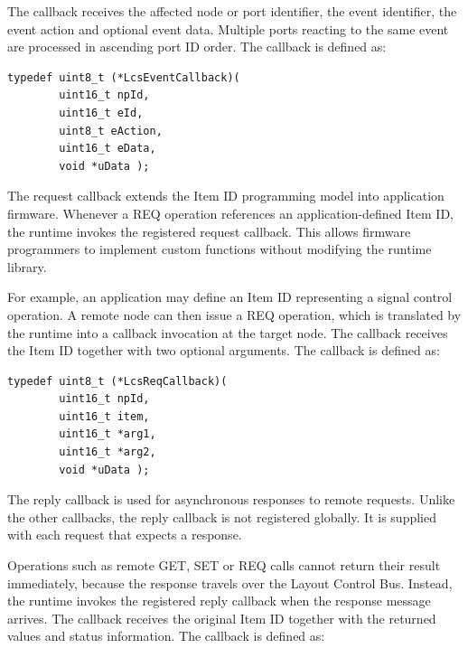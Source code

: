 The callback receives the affected node or port identifier, the event identifier, 
the event action and optional event data. Multiple ports reacting to the same 
event are processed in ascending port ID order. The callback is defined as:

\begin{lstlisting}[style=api-interface]
typedef uint8_t (*LcsEventCallback)(
        uint16_t npId,
        uint16_t eId,
        uint8_t eAction,
        uint16_t eData,
        void *uData );
\end{lstlisting}


The request callback extends the Item ID programming model into application 
firmware. Whenever a REQ operation references an application-defined Item ID, 
the runtime invokes the registered request callback. This allows firmware
programmers to implement custom functions without modifying the runtime library.

For example, an application may define an Item ID representing a signal control 
operation. A remote node can then issue a REQ operation, which is translated 
by the runtime into a callback invocation at the target node. The callback 
receives the Item ID together with two optional arguments. The callback is 
defined as:

\begin{lstlisting}[style=api-interface]
typedef uint8_t (*LcsReqCallback)(
        uint16_t npId,
        uint16_t item,
        uint16_t *arg1,
        uint16_t *arg2,
        void *uData );
\end{lstlisting}



The reply callback is used for asynchronous responses to remote requests. Unlike 
the other callbacks, the reply callback is not registered globally. It is 
supplied with each request that expects a response.

Operations such as remote GET, SET or REQ calls cannot return their result 
immediately, because the response travels over the Layout Control Bus. Instead, 
the runtime invokes the registered reply callback when the response message 
arrives. The callback receives the original Item ID together with the returned 
values and status information. The callback is defined as:

